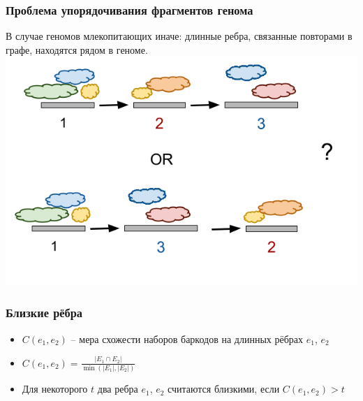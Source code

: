 \documentclass[12pt,pdf,hyperref={unicode}]{beamer}
\begin{document}
\begin{frame}
\frametitle{Проблема упорядочивания фрагментов генома}
В случае геномов млекопитающих иначе: длинные ребра, связанные повторами в графе, находятся рядом в геноме. 
\center
\includegraphics[scale=0.45]{OR.png}
\end{frame}

\begin{frame}
 \frametitle{Близкие рёбра}
 \begin{itemize}
 \item $C(e_1, e_2)$ -- мера схожести наборов баркодов на длинных рёбрах $e_1$, $e_2$
 \item $C(e_1, e_2) = \frac{|E_1 \cap E_2|}{\min(|E_1|, |E_2|)}$
 \item Для некоторого $t$ два ребра $e_1$, $e_2$ считаются близкими, если $C(e_1, e_2) > t$
 \end{itemize}
\end{frame}
\end{document}
